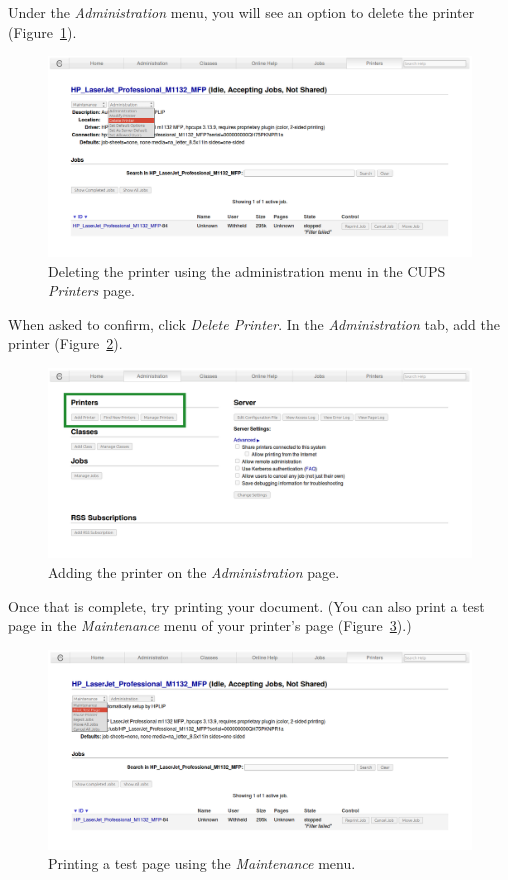 \documentclass[12pt, a4paper]{article}
\begin{document}
\noindent Under the \emph{Administration} menu, you will see an option to delete the printer (Figure~\ref{fig3}).

\begin{figure}[!h]
  \centering
  \includegraphics[width=1\textwidth]{imgs/Filter_failed_3.png}
  \caption{Deleting the printer using the administration menu in the CUPS \emph{Printers} page.}
  \label{fig3}
\end{figure}

\noindent When asked to confirm, click \emph{Delete Printer}. In the \emph{Administration} tab, add the printer (Figure~\ref{fig4}). 

\newpage
\begin{figure}[!hbp]
  \centering
  \includegraphics[width=1\textwidth]{imgs/Filter_failed_4.png}
  \caption{Adding the printer on the \emph{Administration} page.}
  \label{fig4}
\end{figure}

\noindent Once that is complete, try printing your document. (You can also print a test page in the \emph{Maintenance} menu of your printer's page (Figure~\ref{fig5}).)

\begin{figure}[!hbp]
  \centering
  \includegraphics[width=1\textwidth]{imgs/Filter_failed_5.png}
  \caption{Printing a test page using the \emph{Maintenance} menu.}
  \label{fig5}
\end{figure}
\end{document}
